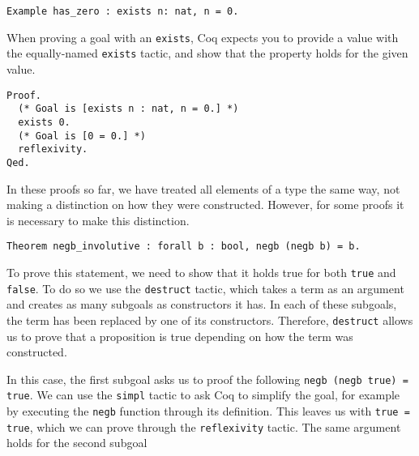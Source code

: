 \begin{verbatim}
Example has_zero : exists n: nat, n = 0.
\end{verbatim}

When proving a goal with an \texttt{exists}, Coq expects you to provide a value with the 
equally-named \texttt{exists} tactic, and show that the property holds for the given value.

\begin{verbatim}
Proof.
  (* Goal is [exists n : nat, n = 0.] *)
  exists 0. 
  (* Goal is [0 = 0.] *)
  reflexivity.
Qed.
\end{verbatim}


In these proofs so far, we have treated all elements of a type the same way, not making a distinction on
how they were constructed. However, for some proofs it is necessary to make this distinction.

\begin{verbatim}
Theorem negb_involutive : forall b : bool, negb (negb b) = b.
\end{verbatim}

To prove this statement, we need to show that it holds true for both \texttt{true} and 
\texttt{false}. To do so we use the \texttt{destruct} tactic, which takes a term as
an argument and creates as many subgoals as constructors it has. In each of these subgoals, the term
has been replaced by one of its constructors. Therefore, \texttt{destruct} allows us to prove
that a proposition is true depending on how the term was constructed.

In this case, the first subgoal asks us to proof the following \texttt{negb (negb true) = true}.
We can use the \texttt{simpl} tactic to ask Coq to simplify the goal, for example by executing
the \texttt{negb} function through its definition. This leaves us with 
\texttt{true = true}, which we can prove through the \texttt{reflexivity} tactic. The
same argument holds for the second subgoal

